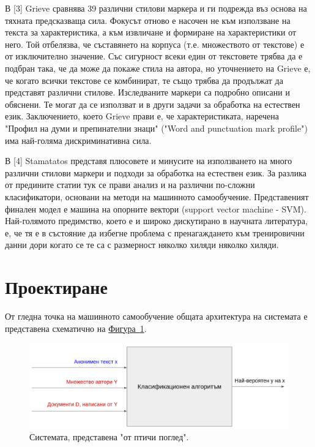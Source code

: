 \documentclass[12pt]{article}
\begin{document}
\vspace{1em}

В [3] Grieve сравнява 39 различни стилови маркера и ги подрежда въз основа на тяхната предсказваща сила. Фокусът отново е насочен не към използване на текста за характеристика, а към извличане и формиране на характеристики от него. Той отбелязва, че съставянето на корпуса (т.е. множеството от текстове) е от изключително значение. Със сигурност всеки един от текстовете трябва да е подбран така, че да може да покаже стила на автора, но уточнението на Grieve е, че когато всички текстове се комбинират, те също трябва да продължат да представят различни стилове. Изследваните маркери са подробно описани и обяснени. Те могат да се използват и в други задачи за обработка на естествен език. Заключението, което Grieve прави е, че характеристиката, наречена "Профил на думи и препинателни знаци" ("Word and punctuation mark profile") има най-голяма дискриминативна сила.

\vspace{1em}

В [4] Stamatatos представя плюсовете и минусите на използването на много различни стилови маркери и подходи за обработка на естествен език. За разлика от предините статии тук се прави анализ и на различни по-сложни класификатори, основани на методи на машинното самообучение. Представеният финален модел е машина на опорните вектори (support vector machine - SVM). Най-голямото предимство, което е и широко дискутирано в научната литература, е, че тя е в състояние да избегне проблема с пренагаждането към тренировични данни дори когато се те са с размерност няколко хиляди няколко хиляди.



\section{Проектиране}


От гледна точка на машинното самообучение общата архитектура на системата е представена схематично на \hyperref[fig:bigP]{Фигура~\ref*{fig:bigP}}.

\begin{figure}
\centering
    \includegraphics[scale=0.3]{./images/big_picture.png}
    \caption{Системата, представена "от птичи поглед".}
    \label{fig:bigP}
\end{figure}
\end{document}
